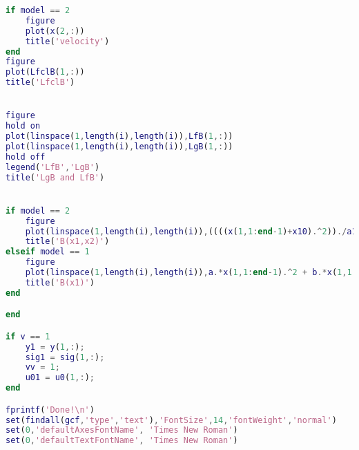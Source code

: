 \begin{lstlisting}[language=matlab]
if model == 2
    figure
    plot(x(2,:))
    title('velocity')
end
figure
plot(LfclB(1,:))
title('LfclB')


figure
hold on
plot(linspace(1,length(i),length(i)),LfB(1,:))
plot(linspace(1,length(i),length(i)),LgB(1,:))
hold off
legend('LfB','LgB')
title('LgB and LfB')


if model == 2
    figure
    plot(linspace(1,length(i),length(i)),((((x(1,1:end-1)+x10).^2))./a1^2 + ((x(2,1:end-1)+x20).^2)./b1^2)*c1 + c2)
    title('B(x1,x2)')
elseif model == 1
    figure
    plot(linspace(1,length(i),length(i)),a.*x(1,1:end-1).^2 + b.*x(1,1:end-1) + c)
    title('B(x1)')
end

end

if v == 1
    y1 = y(1,:);
    sig1 = sig(1,:);
    vv = 1;
    u01 = u0(1,:);
end

fprintf('Done!\n')
set(findall(gcf,'type','text'),'FontSize',14,'fontWeight','normal')
set(0,'defaultAxesFontName', 'Times New Roman')
set(0,'defaultTextFontName', 'Times New Roman')
\end{lstlisting}